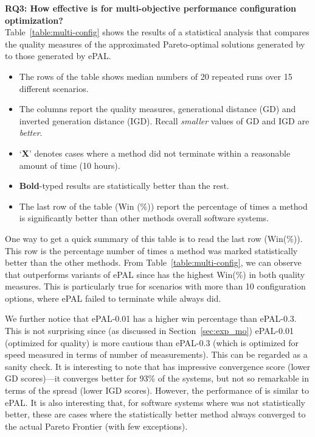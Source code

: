 \noindent\textbf{RQ3: How effective is \flash for multi-objective performance configuration optimization?} \\
Table~\ref{table:multi-config} shows the results of a statistical analysis that compares the quality measures of the approximated Pareto-optimal solutions generated by \flash to those generated by ePAL.
\begin{itemize}[leftmargin=*]
    \item The rows of the table shows median numbers of 20 repeated runs over 15 different scenarios.
    \item The columns report the quality measures, generational distance (GD) and inverted generation distance (IGD). Recall \textit{smaller} values of GD and IGD are \textit{better}.
    \item `\textbf{X}' denotes cases where a method did not terminate within a reasonable amount of time (10 hours).
    \item \textbf{Bold}-typed results are statistically better than the rest.
    \item The last row of the table (Win (\%)) report the percentage of times a method is significantly better than other methods overall software systems.
\end{itemize}

One way to get a quick summary of this table is to read the last row (Win(\%)). This row is the percentage number of times a method was marked statistically better than the other methods. From Table~\ref{table:multi-config}, we can observe that \flash outperforms variants of ePAL since \flash has the highest Win(\%) in both quality measures. This is particularly true for scenarios with more than 10 configuration options, where ePAL failed to terminate while \flash always did. 

We further notice that ePAL-0.01 has a higher win percentage than ePAL-0.3. This is not surprising since (as discussed in Section~\ref{sec:exp_mo}) ePAL-0.01 (optimized for quality) is more cautious than ePAL-0.3 (which is optimized for speed measured in terms of number of measurements). This can be regarded as a sanity check.  It is interesting to note that \flash has impressive convergence score (lower GD scores)---it converges better for 93\% of the systems, but not so remarkable in terms of the spread (lower IGD scores). However, the performance of \flash is similar to ePAL.
It is also interesting that, for software systems where \flash was not statistically better, these are cases where the statistically better method always converged to the actual Pareto Frontier (with few exceptions). 

